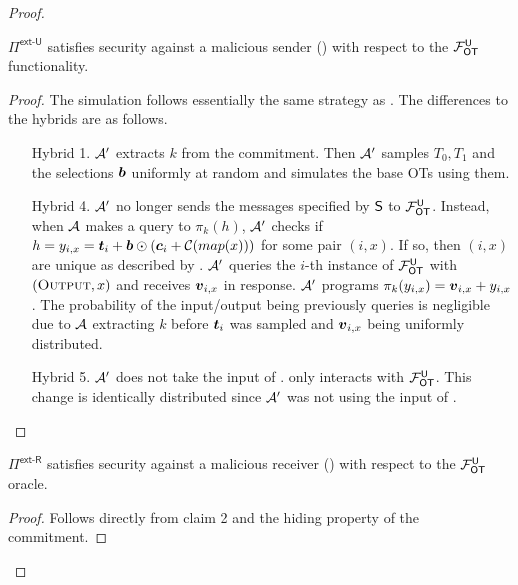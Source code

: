 \begin{proof}\label{proof:ext_U_U}
	\begin{claim}\label{claim:ext-U-U-MalSender}
		$\Pi^{\textsf{ext-U}}$ satisfies security against a malicious sender () with respect to the $\OOT^\U$ functionality.
	\end{claim}
	\begin{proof}
		The simulation follows essentially the same strategy as .
		The differences to the hybrids are as follows.
		\begin{enumerate}[leftmargin=1.8cm]
			\item[Hybrid 1.] $\Adv'$ extracts $k$ from the commitment. Then $\Adv'$ samples $T_0,T_1$ and the selections $\bb$ uniformly at random and simulates the base OTs using them.
			
			\item[Hybrid 4.] $\Adv'$ no longer sends the messages specified by $\send$ to $\OOT^\U$. Instead, when $\Adv$ makes a query to $\pi_k(h)$, $\Adv'$ checks if $h=y_{i,x}=\tt_i +\bb\odot( \cc_i + \mathcal{C}(map(x)))$ for some pair $(i,x)$. If so, then $(i,x)$ are unique as described by . $\Adv'$ queries the $i$-th instance of $\OOT^\U$ with $(\textsc{Output}, x)$ and receives $\vv_{i,x}$ in response. $\Adv'$ programs $\pi_k(y_{i,x})=\vv_{i,x}+y_{i,x}$. The probability of the input/output being previously queries is negligible due to $\Adv$ extracting $k$ before $\tt_i$ was sampled and $\vv_{i,x}$ being uniformly distributed.
			
			\item[Hybrid 5.] $\Adv'$ does not take the input of \rec. \rec only interacts with $\OOT^\U$. This change is identically distributed since $\Adv'$ was not using the input of \rec.
		\end{enumerate}
	\end{proof}
	\begin{claim}\label{claim:ext-U-U-MalReceiver}
		$\Pi^{\textsf{ext-R}}$ satisfies security against a malicious receiver () with respect to the $\OOT^\U$ oracle.
	\end{claim}
	\begin{proof}
		Follows directly from  claim 2 and the hiding property of the commitment. 
		\pe
	\end{proof}
	\pe
\end{proof}